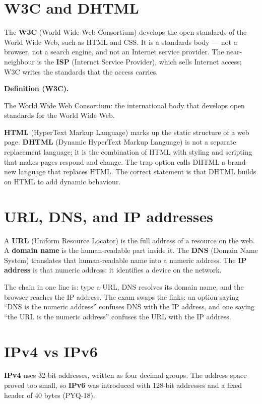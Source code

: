 \documentclass[11pt]{article}
\newenvironment{definitionbox}[1]{%
  \par\noindent\textbf{Definition (#1).}\ \itshape
}{\par\vspace{0.3em}}
\begin{document}
\section{W3C and DHTML}
The \textbf{W3C} (World Wide Web Consortium) develops the open standards of
the World Wide Web, such as HTML and CSS. It is a standards body --- not a
browser, not a search engine, and not an Internet service provider. The
near-neighbour is the \textbf{ISP} (Internet Service Provider), which sells
Internet access; W3C writes the standards that the access carries.

\begin{definitionbox}{W3C}
The World Wide Web Consortium: the international body that develops open
standards for the World Wide Web.
\end{definitionbox}

\textbf{HTML} (HyperText Markup Language) marks up the static structure of a
web page. \textbf{DHTML} (Dynamic HyperText Markup Language) is not a
separate replacement language; it is the combination of HTML with styling and
scripting that makes pages respond and change. The trap option calls DHTML a
brand-new language that replaces HTML. The correct statement is that DHTML
builds on HTML to add dynamic behaviour.

\section{URL, DNS, and IP addresses}
A \textbf{URL} (Uniform Resource Locator) is the full address of a resource
on the web. A \textbf{domain name} is the human-readable part inside it. The
\textbf{DNS} (Domain Name System) translates that human-readable name into a
numeric address. The \textbf{IP address} is that numeric address: it
identifies a device on the network.

The chain in one line is: type a URL, DNS resolves its domain name, and the
browser reaches the IP address. The exam swaps the links: an option saying
``DNS is the numeric address'' confuses DNS with the IP address, and one
saying ``the URL is the numeric address'' confuses the URL with the IP
address.

\section{IPv4 vs IPv6}
\textbf{IPv4} uses 32-bit addresses, written as four decimal groups. The
address space proved too small, so \textbf{IPv6} was introduced with 128-bit
addresses and a fixed header of 40 bytes (PYQ-18).
\end{document}
